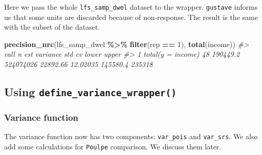 \documentclass[
]{article}
\newenvironment{Shaded}{\begin{snugshade}}{\end{snugshade}}
\newcommand{\CommentTok}[1]{\textcolor[rgb]{0.56,0.35,0.01}{\textit{#1}}}
\newcommand{\DecValTok}[1]{\textcolor[rgb]{0.00,0.00,0.81}{#1}}
\newcommand{\FunctionTok}[1]{\textcolor[rgb]{0.13,0.29,0.53}{\textbf{#1}}}
\newcommand{\NormalTok}[1]{#1}
\newcommand{\SpecialCharTok}[1]{\textcolor[rgb]{0.81,0.36,0.00}{\textbf{#1}}}
\begin{document}
Here we pass the whole \texttt{lfs\_samp\_dwel} dataset to the wrapper.
\texttt{gustave} informs us that some units are discarded because of
non-response. The result is the same with the subset of the dataset.

\begin{Shaded}
\begin{Highlighting}[]
\FunctionTok{precision\_nrc}\NormalTok{(lfs\_samp\_dwel }\SpecialCharTok{\%\textgreater{}\%} \FunctionTok{filter}\NormalTok{(rep }\SpecialCharTok{==} \DecValTok{1}\NormalTok{), }\FunctionTok{total}\NormalTok{(income))}
\CommentTok{\#\textgreater{}                call  n      est  variance      std       cv    lower  upper}
\CommentTok{\#\textgreater{} 1 total(y = income) 48 190449.2 524074026 22892.66 12.02035 145580.4 235318}
\end{Highlighting}
\end{Shaded}

\subsection{\texorpdfstring{Using
\texttt{define\_variance\_wrapper()}}{Using define\_variance\_wrapper()}}\label{using-define_variance_wrapper-1}

\subsubsection{Variance function}\label{variance-function-1}

The variance function now has two components: \texttt{var\_pois} and
\texttt{var\_srs}. We also add some calculations for \texttt{Poulpe}
comparison. We discuss them later.
\end{document}
